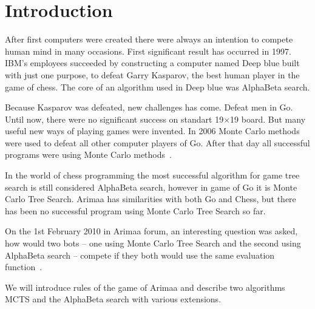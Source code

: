 \chapter{Introduction}
After first computers were created there were always an intention to compete
human mind in many occasions. First significant result has occurred in 1997.
IBM's employees succeeded by constructing a computer named Deep blue built with
just one purpose, to defeat Garry Kasparov, the best human player in the game
of chess. The core of an algorithm used in Deep blue was AlphaBeta search.

Because Kasparov was defeated, new challenges has come. Defeat men in Go. Until
now, there were no significant success on standart 19$\times$19 board. But many
useful new ways of playing games were invented. In 2006 Monte Carlo methods
were used to defeat all other computer players of Go. After that day all
successful programs were using Monte Carlo methods~\cite{MoGo}.

In the world of chess programming the most successful algorithm for game tree
search is still considered AlphaBeta search, however in game of Go it is Monte
Carlo Tree Search. Arimaa has similarities with both Go and Chess, but there
has been no successful program using Monte Carlo Tree Search so far.

On the 1st February 2010 in Arimaa forum, an interesting question was asked,
how would two bots --  one using Monte Carlo Tree Search and the second using
AlphaBeta search -- compete if they both would use the same evaluation
function~\cite{arimaa.com}.

We will introduce rules of the game of Arimaa and describe two algorithms
\ac{MCTS} and the AlphaBeta search with various extensions.


